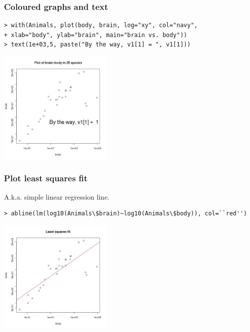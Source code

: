 \documentclass{beamer}
\begin{document}
\begin{frame}[fragile]

 \frametitle{Coloured graphs and text}
 \begin{footnotesize}
\begin{verbatim}
> with(Animals, plot(body, brain, log="xy", col="navy",
+ xlab="body", ylab="brain", main="brain vs. body"))
> text(1e+03,5, paste("By the way, v1[1] = ", v1[1]))
 \end{verbatim}
\end{footnotesize}
 \vspace{-0.7cm}
 \begin{center}
\includegraphics[height=5.5cm]{figs/plot.jpg}  
 \end{center}

\end{frame}


\begin{frame}[fragile]

 \frametitle{Plot least squares fit}
A.k.a. simple linear regression line.
 \begin{footnotesize}
\begin{verbatim}
> abline(lm(log10(Animals\$brain)~log10(Animals\$body)), col=``red'')
 \end{verbatim}
\end{footnotesize}
 \vspace{-0.7cm}
 \begin{center}
\includegraphics[height=5.5cm]{figs/lm.jpeg}  
 \end{center}

\end{frame}
\end{document}
